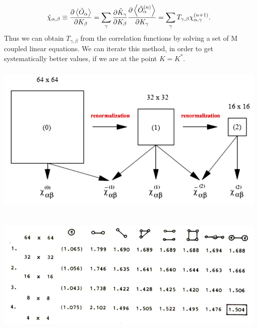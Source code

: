 $$
\tilde{\chi}_{\alpha,\beta} \equiv \frac{\partial \left<\tilde{O}_\alpha\right>}{\partial K_\beta} =
\sum_\gamma {     \ensuremath\frac{\partial \tilde{K}_\gamma}{\partial K_\beta}    \ensuremath\frac{\partial \left<\tilde{O}_\alpha^{\ensuremath{\left(n\right)}}\right>}{\partial K_\gamma}    }  =
\sum_\gamma  {   T_{\gamma, \beta}  \chi_{\alpha,\gamma}^{\ensuremath{\left(n+1\right)}}  }.
$$
Thus we can obtain $T_{\gamma, \beta}$ from the correlation functions by solving a set of M coupled linear equations. We can iterate this method, in order to get systematically better values, if we are at the point $K=K^*$.

\vspace{0.1cm}
\noindent
\begin{minipage}{\textwidth}
\begin{minipage}{.98\textwidth}
  \centering
  \includegraphics[height=210pt]{pics/mc_renorm}
  \label{fig:mc_renorm}
\end{minipage}
\end{minipage}
\vspace{0.1cm}



\vspace{0.1cm}
\noindent
\begin{minipage}{\textwidth}
\begin{minipage}{.98\textwidth}
  \centering
  \includegraphics[height=170pt]{pics/nu4_potts}
  \label{fig:nu4_potts}
\end{minipage}
\end{minipage}
\vspace{0.1cm}



